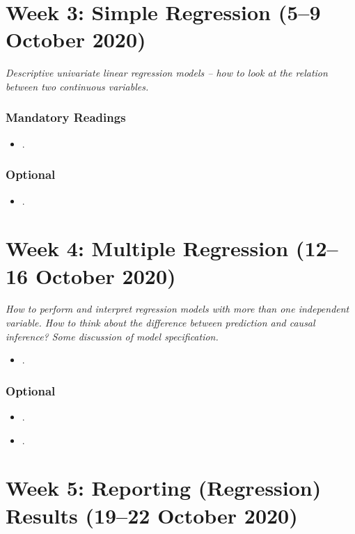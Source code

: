 \documentclass[abstract=on,parskip=full,headings=standardclasses,fontsize=11pt,paper=a4]{scrartcl}
\begin{document}
\section{Week 3: Simple Regression (5--9 October 2020)}

\textit{Descriptive univariate linear regression models -- how to look at the relation between two continuous variables.}


\subsubsection*{Mandatory Readings}

\begin{itemize}
\item {}.
\end{itemize}


\subsubsection*{Optional}
\begin{itemize}
\item {}.
\end{itemize}


\section{Week 4:  Multiple Regression (12--16 October 2020)}

\textit{How to perform and interpret regression models with more than one independent variable. How to think about the difference between prediction and causal inference? Some discussion of model specification.}


\begin{itemize}
\item {}.
\end{itemize}

\subsubsection*{Optional}
\begin{itemize}
\item {}.
\item {}.
\end{itemize}


\section{Week 5: Reporting (Regression) Results (19--22 October 2020)}
\end{document}
